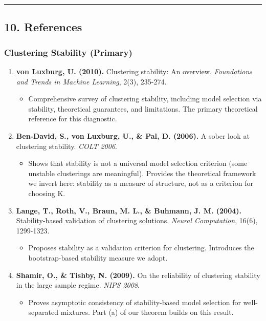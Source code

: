 \documentclass[
  12pt,
]{article}
\providecommand{\tightlist}{%
  \setlength{\itemsep}{0pt}\setlength{\parskip}{0pt}}
\begin{document}
\begin{center}\rule{0.5\linewidth}{0.5pt}\end{center}

\subsection{10. References}\label{references}

\subsubsection{Clustering Stability
(Primary)}\label{clustering-stability-primary}

\begin{enumerate}
\def\labelenumi{\arabic{enumi}.}
\tightlist
\item
  \textbf{von Luxburg, U. (2010).} Clustering stability: An overview.
  \emph{Foundations and Trends in Machine Learning}, 2(3), 235-274.

  \begin{itemize}
  \tightlist
  \item
    Comprehensive survey of clustering stability, including model
    selection via stability, theoretical guarantees, and limitations.
    The primary theoretical reference for this diagnostic.
  \end{itemize}
\item
  \textbf{Ben-David, S., von Luxburg, U., \& Pal, D. (2006).} A sober
  look at clustering stability. \emph{COLT 2006}.

  \begin{itemize}
  \tightlist
  \item
    Shows that stability is not a universal model selection criterion
    (some unstable clusterings are meaningful). Provides the theoretical
    framework we invert here: stability as a measure of structure, not
    as a criterion for choosing K.
  \end{itemize}
\item
  \textbf{Lange, T., Roth, V., Braun, M. L., \& Buhmann, J. M. (2004).}
  Stability-based validation of clustering solutions. \emph{Neural
  Computation}, 16(6), 1299-1323.

  \begin{itemize}
  \tightlist
  \item
    Proposes stability as a validation criterion for clustering.
    Introduces the bootstrap-based stability measure we adopt.
  \end{itemize}
\item
  \textbf{Shamir, O., \& Tishby, N. (2009).} On the reliability of
  clustering stability in the large sample regime. \emph{NIPS 2008}.

  \begin{itemize}
  \tightlist
  \item
    Proves asymptotic consistency of stability-based model selection for
    well-separated mixtures. Part (a) of our theorem builds on this
    result.
  \end{itemize}
\end{enumerate}
\end{document}
